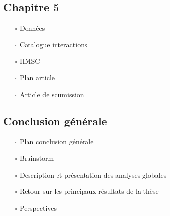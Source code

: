 \hypertarget{chapitre-5}{%
\subsection*{Chapitre 5}\label{chapitre-5}}

\begin{itemize}
\tightlist
\item[$\square$]
  Données
\item[$\square$]
  Catalogue interactions
\item[$\square$]
  HMSC
\item[$\square$]
  Plan article
\item[$\square$]
  Article de soumission
\end{itemize}

\hypertarget{conclusion-guxe9nuxe9rale}{%
\subsection*{Conclusion générale}\label{conclusion-guxe9nuxe9rale}}

\begin{itemize}
\tightlist
\item[$\square$]
  Plan conclusion générale
\item[$\square$]
  Brainstorm
\item[$\square$]
  Description et présentation des analyses globales
\item[$\square$]
  Retour sur les principaux résultats de la thèse
\item[$\square$]
  Perspectives
\end{itemize}
